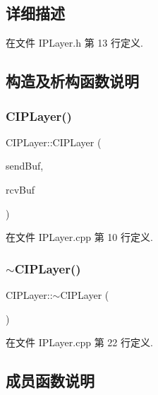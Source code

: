 \subsection{详细描述}


在文件 I\+P\+Layer.\+h 第 13 行定义.



\subsection{构造及析构函数说明}
\mbox{\label{class_c_i_p_layer_a29f18d33abf037633c2dce2ed727ca5e}} 
\subsubsection{\texorpdfstring{C\+I\+P\+Layer()}{CIPLayer()}}
{\footnotesize\ttfamily C\+I\+P\+Layer\+::\+C\+I\+P\+Layer (\begin{DoxyParamCaption}\item[{\hyperlink{class_msg_list}{Msg\+List} \&}]{send\+Buf,  }\item[{\hyperlink{class_msg_list}{Msg\+List} \&}]{rcv\+Buf }\end{DoxyParamCaption})}



在文件 I\+P\+Layer.\+cpp 第 10 行定义.

\mbox{\label{class_c_i_p_layer_a064dc4bd7137c3c1a509ff3b9f23765a}} 
\subsubsection{\texorpdfstring{$\sim$\+C\+I\+P\+Layer()}{~CIPLayer()}}
{\footnotesize\ttfamily C\+I\+P\+Layer\+::$\sim$\+C\+I\+P\+Layer (\begin{DoxyParamCaption}{ }\end{DoxyParamCaption})}



在文件 I\+P\+Layer.\+cpp 第 22 行定义.



\subsection{成员函数说明}
\mbox{\label{class_c_i_p_layer_a4a73e335cc0801fe2a7f0de6ab955411}} 
